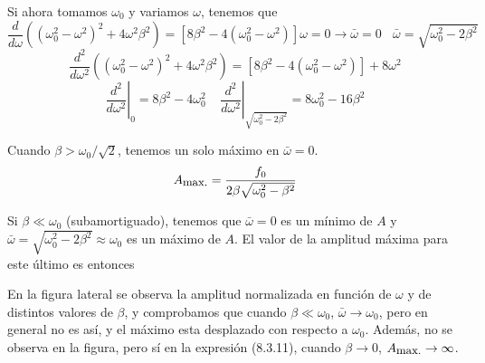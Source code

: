Si ahora tomamos $\omega_0$ y variamos $\omega$, tenemos que
\begin{equation} \label{6.1.1}
    \frac{d}{d \omega} \left(\left(\omega_0^2 -\omega^2\right)^2+4\omega^2 \beta^2\right) =\left[8\beta^2-4\left(\omega_0^2 -\omega^2\right)\right]\omega = 0   \rightarrow \bar{\omega} = 0 \ \ \ \ \bar{\omega} =  \sqrt{\omega_0^2-2\beta^2}
\end{equation}
\[
    \frac{d^2}{d \omega^2} \left(\left(\omega_0^2 -\omega^2\right)^2+4\omega^2 \beta^2\right) = \left[8\beta^2-4\left(\omega_0^2 -\omega^2\right)\right] + 8\omega^2
\]
\begin{equation} \label{6.1.1}
    \left.\frac{d^2}{d \omega^2}\right|_0 = 8\beta^2 - 4\omega_0^2  \ \ \ \ \ \left.\frac{d^2}{d \omega^2}\right|_{\sqrt{\omega_0^2-2\beta^2}} = 8\omega_0^2-16\beta^2
\end{equation}
Cuando $\beta > \omega_0 /\sqrt{2}$, tenemos un solo máximo en $\bar{\omega} = 0$.
\begin{equation} \label{6.1.1}
    A_{\mbox{\small max.}} = \frac{f_0}{2\beta \sqrt{\omega_0^2-\beta^2}}
\end{equation}

Si $\beta \ll \omega_0$ (subamortiguado), tenemos que $\bar{\omega} = 0$ es un mínimo de $A$ y $\bar{\omega} = \sqrt{\omega_0^2-2\beta^2} \approx \omega_0$ es un máximo de $A$. El valor de la amplitud máxima para este último es entonces

En la figura lateral se observa la amplitud normalizada en función de  $\omega$ y de distintos valores de $\beta$, y comprobamos que cuando $\beta \ll \omega_0$, $\bar{\omega} \rightarrow \omega_0$, pero en general no es así, y el máximo esta desplazado con respecto a $\omega_0$.
Además, no se observa en la figura, pero sí en la expresión (8.3.11), cuando $\beta \rightarrow 0$, $A_{\mbox{\small max.}} \rightarrow \infty$.

